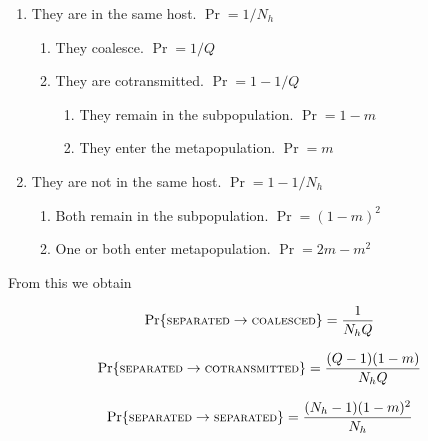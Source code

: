 \documentclass[_main.tex]{subfiles}
\begin{document}
\begin{enumerate} [noitemsep]

\item They are in the same host.  $\Pr = 1/N_h$

\begin{enumerate} [noitemsep]

\item They coalesce. $\Pr = 1/Q$

\item They are cotransmitted. $\Pr = 1 - 1/Q$

\begin{enumerate} [noitemsep]

\item They remain in the subpopulation. $\Pr = 1 - m$ 

\item They enter the metapopulation. $\Pr = m$

\end{enumerate}

\end{enumerate}

\item They are not in the same host. $\Pr = 1 - 1/N_h$

\begin{enumerate} [noitemsep]

\item Both remain in the subpopulation. $\Pr = (1 - m)^2$

\item One or both enter metapopulation. $\Pr = 2m - m^2$

\end{enumerate}

\end{enumerate}

\noindent From this we obtain

\begin{equation*} \label{eq:coal321}
\Pr \{ \textsc{\small{separated}} \rightarrow \textsc{\small{coalesced}} \} 
= \frac{1}{N_h Q}
\end{equation*}

\begin{equation*} \label{eq:coal321}
\Pr \{ \textsc{\small{separated}} \rightarrow \textsc{\small{cotransmitted}} \} 
= \frac{(Q -1)(1-m)}{N_h Q}
\end{equation*}

\begin{equation*} \label{eq:coal321}
\Pr \{ \textsc{\small{separated}} \rightarrow \textsc{\small{separated}} \} 
= \frac{(N_h - 1)(1-m)^2}{N_h}
\end{equation*}
\end{document}
